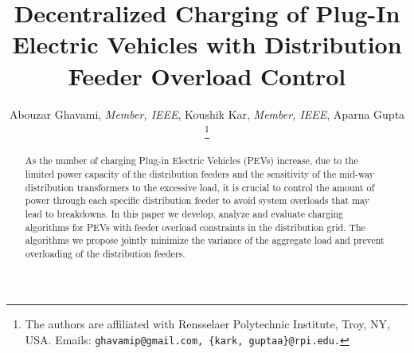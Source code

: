 \documentclass[12pt,draftcls,onecolumn]{IEEEtran}
\title{\LARGE \bf Decentralized Charging of Plug-In Electric Vehicles with Distribution Feeder Overload Control}
\author{Abouzar Ghavami, \textit{Member, IEEE}, Koushik Kar, \textit{Member, IEEE}, Aparna Gupta
\thanks{The authors are affiliated with Rensselaer Polytechnic Institute, Troy, NY, USA. Emails: \tt\small ghavamip@gmail.com, \{kark, guptaa\}@rpi.edu.}}
\begin{document}
\maketitle
\let\thefootnote\relax{}
\newtheorem{Def}{Definition}
\newtheorem{Thm}{Theorem}
\newtheorem{Alg}{Algorithm}
\newtheorem{Lem}{Lemma}
\thispagestyle{empty}
\pagestyle{plain}
\begin{abstract}
As the number of charging Plug-in Electric Vehicles (PEVs) increase, due to the limited power capacity of the distribution feeders and the sensitivity of the mid-way distribution transformers to the excessive load, it is crucial to control the amount of power through each specific distribution feeder to avoid system overloads that may lead to breakdowns. In this paper we develop, analyze and evaluate charging algorithms for PEVs with feeder overload constraints in the distribution grid. The algorithms we propose jointly minimize the variance of the aggregate load and prevent overloading of the distribution feeders.
\end{abstract}
\end{document}
